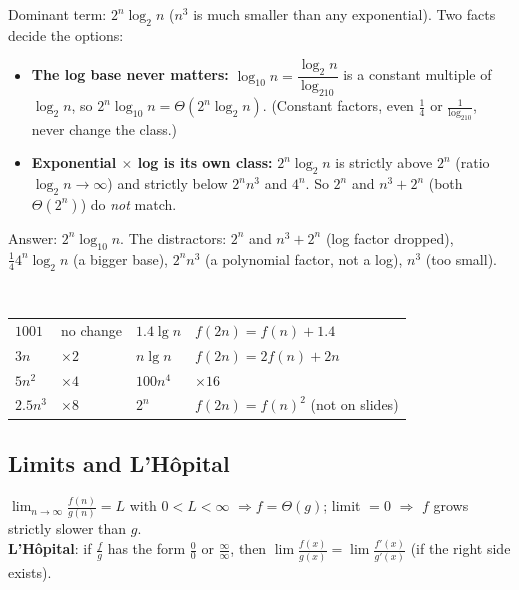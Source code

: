 \documentclass{fkt-notes}
\theoremstyle{definition}
\begin{document}
\begin{example}
  Dominant term: $2^n\log_2n$ ($n^3$ is much smaller than any exponential).
  Two facts decide the options:
  \begin{itemize}[nosep]
    \item \textbf{The log base never matters:} $\log_{10}n=\dfrac{\log_2n}{\log_210}$
          is a constant multiple of $\log_2n$, so $2^n\log_{10}n=\Theta(2^n\log_2n)$.
          (Constant factors, even $\frac14$ or $\frac1{\log_210}$, never change the class.)
    \item \textbf{Exponential $\times$ log is its own class:} $2^n\log_2n$ is
          strictly above $2^n$ (ratio $\log_2n\to\infty$) and strictly
          below $2^nn^3$ and $4^n$. So $2^n$ and $n^3+2^n$ (both
          $\Theta(2^n)$) do \emph{not} match.
  \end{itemize}
  Answer: $2^n\log_{10}n$. The distractors: $2^n$ and $n^3+2^n$ (log
  factor dropped), $\frac14 4^n\log_2n$ (a bigger base), $2^nn^3$ (a
  polynomial factor, not a log), $n^3$ (too small).
\end{example}

\begin{example}\leavevmode\\
  \begin{tabular}[t]{@{}ll@{\qquad}ll@{}}
    $1001$   & no change & $1.4\lg n$ & $f(2n)=f(n)+1.4$               \\
    $3n$     & $\times2$ & $n\lg n$   & $f(2n)=2f(n)+2n$               \\
    $5n^2$   & $\times4$ & $100n^4$   & $\times16$                     \\
    $2.5n^3$ & $\times8$ & $2^n$      & $f(2n)=f(n)^2$ (not on slides)
  \end{tabular}
\end{example}

\subsection{Limits and L'Hôpital}
%
\begin{rulebox}
  $\displaystyle\lim_{n\to\infty}\frac{f(n)}{g(n)}=L$ with $0<L<\infty$
  $\Rightarrow f=\Theta(g)$;\qquad
  limit $=0$ $\Rightarrow$ $f$ grows strictly slower than $g$.\\[4pt]
  \textbf{L'Hôpital}: if $\frac{f}{g}$ has the form $\frac00$ or
  $\frac\infty\infty$, then
  $\displaystyle\lim\frac{f(x)}{g(x)}=\lim\frac{f'(x)}{g'(x)}$ (if the
  right side exists).
\end{rulebox}
\end{document}
